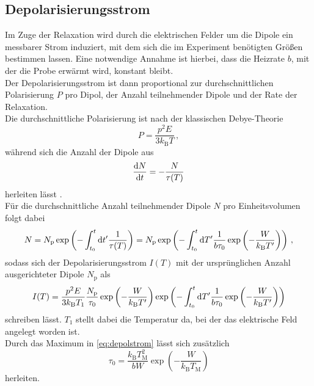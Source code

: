 \subsection{Depolarisierungsstrom}

Im Zuge der Relaxation wird durch die elektrischen Felder um die Dipole ein messbarer Strom induziert, mit dem sich die im Experiment benötigten Größen bestimmen lassen.
Eine notwendige Annahme ist hierbei, dass die Heizrate $b$, mit der die Probe erwärmt wird, konstant bleibt. \\
Der Depolarisierungsstrom ist dann proportional zur durchschnittlichen Polarisierung $P$ pro Dipol, der Anzahl teilnehmender Dipole und der Rate der Relaxation. \\
Die durchschnittliche Polarisierung ist nach der klassischen Debye-Theorie
\begin{equation}
    P = \frac{p^2 E}{3 k_\text{B} T} \,,
    \label{eq:durchPola}
\end{equation}
während sich die Anzahl der Dipole aus
\begin{equation}
    \frac{\mathrm{d} N}{\mathrm{d} t} = - \frac{N}{\tau(T)}
    \label{eq:AnzahlDipole}
\end{equation}
herleiten lässt \cite[S. ~2f.]{fuller}. \\
Für die durchschnittliche Anzahl teilnehmender Dipole $N$ pro Einheitsvolumen folgt dabei
\begin{equation}
    N = N_\text{p} \exp \left(- \int^t_{t_0} \mathrm{d} t' \frac{1}{\tau(T)}\right) =  N_\text{p} \exp \left(- \int^t_{t_0} \mathrm{d} T' \frac{1}{b \tau_0} \exp \left(-\frac{W}{k_\text{B} T'} \right)\right) \,,
    \label{eq:N}
\end{equation}
sodass sich der Depolarisierungsstrom $I(T)$ mit der ursprünglichen Anzahl ausgerichteter Dipole $N_\text{p}$ als 
\begin{equation}
    I(T) = \frac{p^2 E}{3 k_\text{B} T_1} \frac{N_\text{p}}{\tau_0}  \exp \left(-\frac{W}{k_\text{B} T'} \right) \exp \left(- \int^t_{t_0} \mathrm{d} T' \frac{1}{b \tau_0}  \exp \left(-\frac{W}{k_\text{B} T'} \right) \right)
    \label{eq:depolstrom}
\end{equation}
schreiben lässt.
$T_1$ stellt dabei die Temperatur da, bei der das elektrische Feld angelegt worden ist. \\

Durch das Maximum in \eqref{eq:depolstrom} lässt sich zusätzlich
\begin{equation}
    \tau_0 = \frac{k_\text{B} T^2_\text{M}}{b W} \exp \left(- \frac{W}{k_\text{B} T_\text{M}}\right)
    \label{eq:tau0pol}
\end{equation}
herleiten. \\

